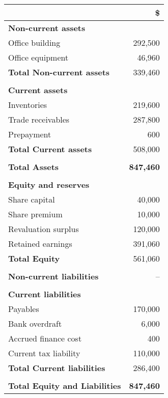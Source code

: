 \begin{tabular}{@{}p{8cm}r@{}}
\toprule
 & \textbf{\$} \\
\midrule
\textbf{Non-current assets} & \\
\quad Office building & 292,500 \\
\quad Office equipment & 46,960 \\
\textbf{Total Non-current assets} & 339,460 \\
\\
\textbf{Current assets} & \\
\quad Inventories & 219,600 \\
\quad Trade receivables & 287,800 \\
\quad Prepayment & 600 \\
\textbf{Total Current assets} & 508,000 \\
\\
\textbf{Total Assets} & \textbf{847,460} \\
\\
\textbf{Equity and reserves} & \\
\quad Share capital & 40,000 \\
\quad Share premium & 10,000 \\
\quad Revaluation surplus & 120,000 \\
\quad Retained earnings & 391,060 \\
\textbf{Total Equity} & 561,060 \\
\\
\textbf{Non-current liabilities} & -- \\
\\
\textbf{Current liabilities} & \\
\quad Payables & 170,000 \\
\quad Bank overdraft & 6,000 \\
\quad Accrued finance cost & 400 \\
\quad Current tax liability & 110,000 \\
\textbf{Total Current liabilities} & 286,400 \\
\\
\textbf{Total Equity and Liabilities} & \textbf{847,460} \\
\bottomrule
\end{tabular}

